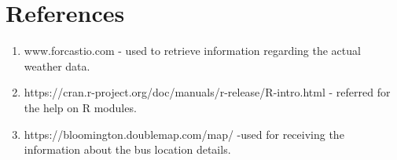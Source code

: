 \documentclass[12pt]{article}
\begin{document}
\section{References}

\begin{enumerate}
	\item www.forcastio.com - used to retrieve information regarding the actual weather data.
	
	\item https://cran.r-project.org/doc/manuals/r-release/R-intro.html - referred for the help on R modules.
	
	\item https://bloomington.doublemap.com/map/ -used for receiving the information about the bus location details.
	
\end{enumerate}
\end{document}
